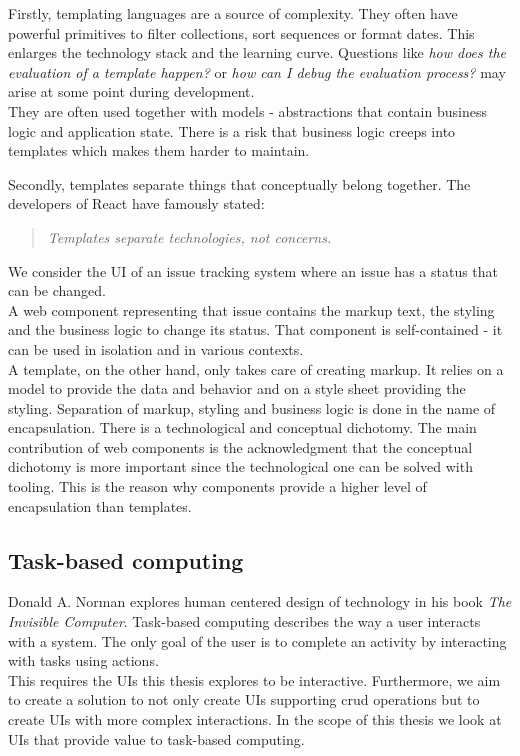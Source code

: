 Firstly, templating languages are a source of complexity. They often have powerful primitives to filter collections, sort sequences or format dates. This enlarges the technology stack and the learning curve. Questions like \textit{how does the evaluation of a template happen?} or \textit{how can I debug the evaluation process?} may arise at some point during development. \\
They are often used together with models - abstractions that contain business logic and application state. There is a risk that business logic creeps into templates which makes them harder to maintain.

Secondly, templates separate things that conceptually belong together. The developers of React have famously stated:
\begin{quote}
\textit{Templates separate technologies, not concerns.}
\end{quote}
We consider the UI of an issue tracking system where an issue has a status that can be changed. \\ A web component representing that issue contains the markup text, the styling and the business logic to change its status. That component is self-contained - it can be used in isolation and in various contexts. \\
A template, on the other hand, only takes care of creating markup. It relies on a model to provide the data and behavior and on a style sheet providing the styling.
Separation of markup, styling and business logic is done in the name of encapsulation. There is a technological and conceptual dichotomy. The main contribution of web components is the acknowledgment that the conceptual dichotomy is more important since the technological one can be solved with tooling. This is the reason why components provide a higher level of encapsulation than templates.

\subsection{Task-based computing}
Donald A. Norman explores human centered design of technology in his book \textit{The Invisible Computer}. Task-based computing describes the way a user interacts with a system. The only goal of the user is to complete an activity by interacting with tasks using actions. \citep{invisiblecomputer} \\
This requires the UIs this thesis explores to be interactive. Furthermore, we aim to create a solution to not only create UIs supporting \gls{crud} operations but to create UIs with more complex interactions. In the scope of this thesis we look at UIs that provide value to task-based computing.

